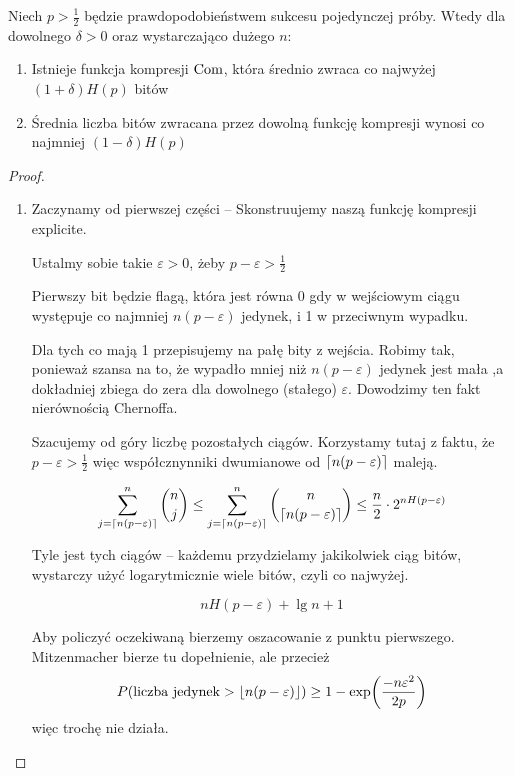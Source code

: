 \begin{theorem}
    Niech \( p > \frac{1}{2} \) będzie prawdopodobieństwem sukcesu pojedynczej próby.
    Wtedy dla dowolnego \( \delta > 0 \) oraz wystarczająco dużego \( n \):
    \begin{enumerate}
        \item Istnieje funkcja kompresji \( \operatorname{Com} \), która średnio zwraca co najwyżej \( (1 + \delta)H(p) \) bitów
        \item Średnia liczba bitów zwracana przez dowolną funkcję kompresji wynosi co najmniej \( (1-\delta)H(p) \)
    \end{enumerate}
\end{theorem}
\begin{proof} \( \)
    \begin{enumerate}
        \item Zaczynamy od pierwszej części -- Skonstruujemy naszą funkcję kompresji explicite.
        
        Ustalmy sobie takie \( \varepsilon > 0 \), żeby \( p - \varepsilon > \frac{1}{2} \)
        
        Pierwszy bit będzie flagą, która jest równa 0 gdy w wejściowym ciągu występuje co najmniej \( n(p - \varepsilon) \) jedynek, i 1 w przeciwnym wypadku.
        
        Dla tych co mają 1 przepisujemy na pałę bity z wejścia. Robimy tak, ponieważ szansa na to, że wypadło mniej niż \( n(p - \varepsilon) \) jedynek jest mała ,a dokładniej zbiega do zera dla dowolnego (stałego) \( \varepsilon \).
        Dowodzimy ten fakt nierównością Chernoffa.
        
        Szacujemy od góry liczbę pozostałych ciągów. Korzystamy tutaj z faktu, że \( p - \varepsilon > \frac{1}{2} \) więc współcznynniki dwumianowe od \( \left\lceil n(p - \varepsilon)\right\rceil \) maleją.
        
        \[
            \sum_{j=\left\lceil n(p - \varepsilon)\right\rceil}^n \binom{n}{j} \leq 
            \sum_{j=\left\lceil n(p - \varepsilon)\right\rceil}^n \binom{n}{\left\lceil n(p - \varepsilon)\right\rceil}
            \leq \frac{n}{2} \cdot 2^{nH(p - \varepsilon)}
        \]
        
        Tyle jest tych ciągów -- każdemu przydzielamy jakikolwiek ciąg bitów, wystarczy użyć logarytmicznie wiele bitów, czyli co najwyżej.
        
        \[
            nH(p - \varepsilon) + \lg n + 1
        \]
        
        Aby policzyć oczekiwaną bierzemy oszacowanie z punktu pierwszego.
        Mitzenmacher bierze tu dopełnienie, ale przecież
        \[
            P(\text{liczba jedynek} > \floor{n(p - \varepsilon)}) \geq 1 - \exp\pars{\frac{-n\varepsilon^2}{2p}}
        \]
        więc trochę nie działa.
        

\end{enumerate}
\end{proof}
